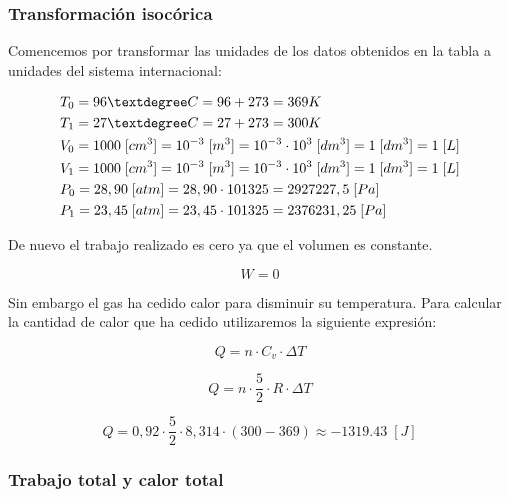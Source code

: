 \documentclass{article}
\begin{document}
\subsubsection{Transformación isocórica}

Comencemos por transformar las unidades de los datos obtenidos en la tabla a unidades del sistema internacional:

\begin{equation}
    \begin{split}
        & T_0 = 96 \textdegree C = 96 + 273 = 369 K  \\
        & T_1 = 27 \textdegree C = 27 + 273 = 300 K  \\
        & V_0 = 1000 \; [cm^3] = 10^{-3} \; [m^3] = 10^{-3} \cdot 10^3 \; [dm^3] = 1 \; [dm^3] = 1 \; [L] \\
        & V_1 = 1000 \; [cm^3] = 10^{-3} \; [m^3] = 10^{-3} \cdot 10^3 \; [dm^3] = 1 \; [dm^3] = 1 \; [L] \\
        & P_0 = 28,90 \; [atm] = 28,90 \cdot 101325 = 2927227,5 \; [Pa] \\
        & P_1 = 23,45 \; [atm] = 23,45 \cdot 101325 = 2376231,25 \; [Pa] \\
    \end{split}
\end{equation}

De nuevo el trabajo realizado es cero ya que el volumen es constante.

\[
    W = 0
\]

Sin embargo el gas ha cedido calor para disminuir su temperatura. Para calcular la cantidad de calor que ha cedido utilizaremos la siguiente expresión:

\begin{equation}
    Q = n \cdot C_v \cdot \Delta T
\end{equation}

\begin{equation}
    Q = n \cdot \frac{5}{2} \cdot R \cdot \Delta T
\end{equation}

\begin{equation}
    Q = 0,92 \cdot \frac{5}{2} \cdot 8,314 \cdot (300 - 369) \approx - 1319.43 \; [J]
\end{equation}

\subsubsection{Trabajo total y calor total}
\end{document}

